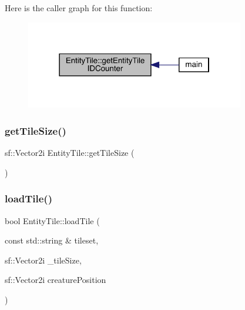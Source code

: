 Here is the caller graph for this function\+:
\nopagebreak
\begin{figure}[H]
\begin{center}
\leavevmode
\includegraphics[width=271pt]{d7/dd4/class_entity_tile_acabd6691ddcf65a812c38e86e12e28e7_icgraph}
\end{center}
\end{figure}
\mbox{\label{class_entity_tile_a5b0c178bfb2b65842c9c70ffafd857a7}} 
\subsubsection{\texorpdfstring{get\+Tile\+Size()}{getTileSize()}}
{\footnotesize\ttfamily sf\+::\+Vector2i Entity\+Tile\+::get\+Tile\+Size (\begin{DoxyParamCaption}{ }\end{DoxyParamCaption})}

\mbox{\label{class_entity_tile_a1a6b6b995ad942e7850f14cc6e693bbc}} 
\subsubsection{\texorpdfstring{load\+Tile()}{loadTile()}}
{\footnotesize\ttfamily bool Entity\+Tile\+::load\+Tile (\begin{DoxyParamCaption}\item[{const std\+::string \&}]{tileset,  }\item[{sf\+::\+Vector2i}]{\+\_\+tile\+Size,  }\item[{sf\+::\+Vector2i}]{creature\+Position }\end{DoxyParamCaption})}

